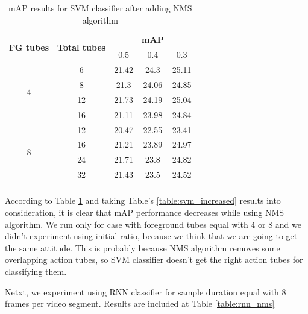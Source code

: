 \documentclass{report}
\begin{document}
\begin{center}
  \begin{longtable}{|| c | c || c c c ||}
    \hline
    \multirow{2}{*}{\textbf{FG tubes}} & \multirow{2}{*}{\textbf{Total tubes}} & {} & \textbf{mAP} & {} \\
    {} & {} & 0.5 & 0.4 & 0.3 \\
    \hline
    \multirow{4}{*}{4} & 6 & 21.42 & 24.3 & 25.11 \\
    \cline{2-5}
    {} & 8 & 21.3 & 24.06 & 24.85 \\
    \cline{2-5}
    {} & 12 & 21.73 & 24.19 & 25.04 \\
    \cline{2-5}
    {} & 16 & 21.11 & 23.98 & 24.84 \\
    \hline
    \multirow{4}{*}{8} & 12 & 20.47 & 22.55 & 23.41 \\
    \cline{2-5}
    {} & 16 & 21.21 & 23.89 & 24.97 \\
    \cline{2-5}
    {} & 24 & 21.71 & 23.8 & 24.82 \\
    \cline{2-5}
    {} & 32 & 21.43 & 23.5 & 24.52 \\
    \hline

  \caption{mAP results for SVM classifier after adding NMS algorithm}
  \label{table:svm_nms}
\end{longtable}
\end{center}

According to Table \ref{table:svm_nms} and taking Table's \ref{table:svm_increased} results into consideration, it is clear that mAP performance decreases while using NMS algorithm.
We run only for case with foreground tubes equal with 4 or 8 and we didn't experiment using initial ratio, because we think that we are going to get the same attitude.
This is probably because NMS algorithm removes some overlapping action tubes, so SVM classifier doesn't get the right action tubes for classifying them. \par

Netxt, we experiment using RNN classifier for sample duration equal with 8 frames per video segment. Results are included at Table \ref{table:rnn_nms}
\end{document}
